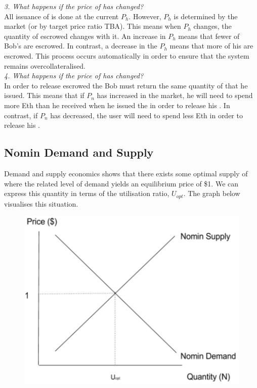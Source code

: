 \noindent \emph{3. What happens if the price of \HAV{} has changed?} \\

\noindent All issuance of \NOM{} is done at the current $P_h$. However, $P_h$ is determined by the market (or by target price ratio TBA). This means when $P_h$ changes, the quantity of escrowed \HAV{} changes with it. An increase in $P_h$ means that fewer of Bob's \HAV{} are escrowed. In contrast, a decrease in the $P_h$ means that more of his \HAV{} are escrowed. This process occurs automatically in order to ensure that the system remains overcollateralised. \\ 

\noindent \emph{4. What happens if the price of \NOM{} has changed?} \\ 

\noindent In order to release escrowed \HAV{} the Bob must return the same quantity of \NOM{} that he issued. This means that if $P_n$ has increased in the market, he will need to spend more Eth than he received when he issued the \NOM{} in order to release his \HAV{}. In contrast, if $P_n$ has decreased, the user will need to spend less Eth in order to release his \HAV{}.

\newpage

\subsection{Nomin Demand and Supply} 

\noindent Demand and supply economics shows that there exists some optimal supply of \NOM{} where the related level of demand yields an equilibrium price of \$1. We can express this quantity in terms of the utilisation ratio, $U_{opt}$. The graph below visualises this situation. \\

\begin{figure}[h!]
    \centering
    \includegraphics[width=.7\textwidth]{img/nomin-demand-vs-supply}
\end{figure}


